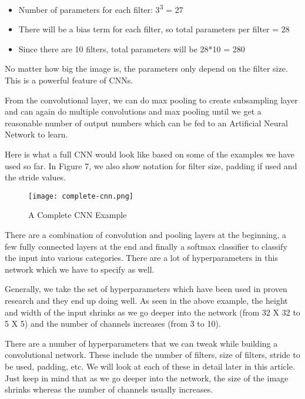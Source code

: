 \begin{itemize}
  \item Number of parameters for each filter: 3\textsuperscript{3} = 27
  \item There will be a bias term for each filter, so total parameters per filter = 28
  \item Since there are 10 filters, total parameters will be 28*10 = 280
\end{itemize}

No matter how big the image is, the parameters only depend on the filter size. This is a powerful feature of CNNs.
\par
From the convolutional layer, we can do max pooling to create subsampling layer and can again do multiple convolutions and max pooling until we get a reasonable number of output numbers which can be fed to an Artificial Neural Network to learn.
\par
Here is what a full CNN would look like based on some of the examples we have used so far. In Figure 7, we also show notation for filter size, padding if used and the stride values.

\begin{figure}
  \caption{A Complete CNN Example}
  \texttt{[image: complete-cnn.png]}
\end{figure}

There are a combination of convolution and pooling layers at the beginning, a few fully connected layers at the end and finally a softmax classifier to classify the input into various categories. There are a lot of hyperparameters in this network which we have to specify as well.
\par
Generally, we take the set of hyperparameters which have been used in proven research and they end up doing well. As seen in the above example, the height and width of the input shrinks as we go deeper into the network (from 32 X 32 to 5 X 5) and the number of channels increases (from 3 to 10).
\par
There are a number of hyperparameters that we can tweak while building a convolutional network.
These include the number of filters, size of filters, stride to be used, padding, etc. We will look at each of these in detail later in this article. Just keep in mind that as we go deeper into the network, the size of the image shrinks whereas the number of channels usually increases.
